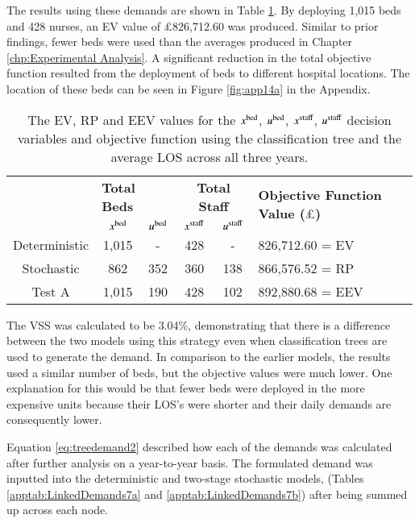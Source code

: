 \documentclass[../thesis.tex]{subfiles}
\begin{document}
The results using these demands are shown in Table \ref{tab:Results6}. By deploying 1,015 beds and 428 nurses, an EV value of $\pounds$826,712.60 was produced. Similar to prior findings, fewer beds were used than the averages produced in Chapter \ref{chp:Experimental Analysis}. A significant reduction in the total objective function resulted from the deployment of beds to different hospital locations. The location of these beds can be seen in Figure \ref{fig:app14a} in the Appendix.


\begin{table}[h!]
    \centering
    \begin{tabular}{cccccl}\toprule
 & \multicolumn{2}{l}{\textbf{Total Beds}} & \multicolumn{2}{c}{\textbf{Total Staff}} & \multirow{2}{*}{\textbf{Objective Function Value ($\pounds$)}}\\ \cmidrule(lr){2-3} \cmidrule(lr){4-5}
 & $x^\textnormal{bed}$           & $u^\textnormal{bed}$          & $x^\textnormal{staff}$         & $u^\textnormal{staff}$         \\ \midrule
    Deterministic      & 1,015 & - & 428 & - & 826,712.60 = EV \\ \midrule
    Stochastic & 862 & 352 & 360&138 &  866,576.52 = RP \\ \midrule
    Test A & 1,015  & 190 & 428 & 102 & 892,880.68 = EEV \\\bottomrule
    \end{tabular}
    \caption{The EV, RP and EEV values for the $x^\textnormal{bed}$, $u^\textnormal{bed}$, $x^\textnormal{staff}$, $u^\textnormal{staff}$ decision
variables and objective function using the classification tree and the average LOS across all three years.}
    \label{tab:Results6}
\end{table}

The VSS was calculated to be 3.04\%, demonstrating that there is a difference between the two models using this strategy even when classification trees are used to generate the demand. In comparison to the earlier models, the results used a similar number of beds, but the objective values were much lower. One explanation for this would be that fewer beds were deployed in the more expensive units because their LOS's were shorter and their daily demands are consequently lower.

Equation \eqref{eq:treedemand2} described how each of the demands was calculated after further analysis on a year-to-year basis. The formulated demand was inputted into the deterministic and two-stage stochastic models, (Tables \ref{apptab:LinkedDemands7a} and \ref{apptab:LinkedDemands7b}) after being summed up across each node.
\end{document}
